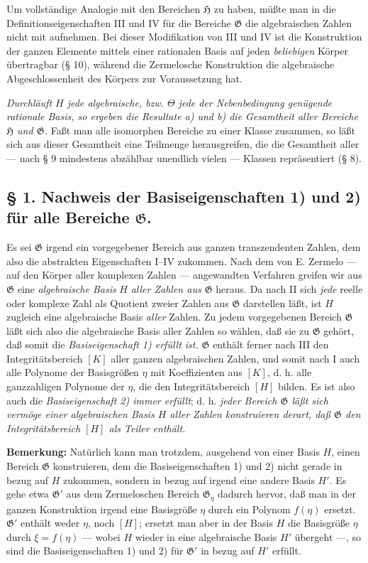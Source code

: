 \documentclass[11pt]{article}
\begin{document}
Um vollständige Analogie mit den Bereichen $\mathfrak H$ zu haben, müßte man
in die Definitionseigenschaften III und IV für die Bereiche $\mathfrak G$ die
algebraischen Zahlen nicht mit aufnehmen. Bei dieser Modifikation von III und
IV ist die Konstruktion der ganzen Elemente mittels einer rationalen Basis auf
jeden \emph{beliebigen} Körper übertragbar (§ 10), während die Zermelosche
Konstruktion die algebraische Abgeschlossenheit des Körpers zur Voraussetzung
hat.

\emph{Durchläuft $H$ jede algebraische, bzw. $\Theta$ jede der Nebenbedingung
genügende rationale Basis, so ergeben die Resultate a) und b) die Gesamtheit
aller Bereiche $\mathfrak H$ und $\mathfrak G$.} Faßt man alle isomorphen
Bereiche zu einer Klasse zusammen, so läßt sich aus dieser Gesamtheit eine
Teilmenge herausgreifen, die die Gesamtheit aller --- nach § 9 mindestens
abzählbar unendlich vielen --- Klassen repräsentiert (§ 8).

\subsection*{§ 1. Nachweis der Basiseigenschaften 1) und 2) für alle Bereiche
$\mathfrak G$.}

Es sei $\mathfrak G$ irgend ein vorgegebener Bereich aus ganzen transzendenten
Zahlen, dem also die abstrakten Eigenschaften I--IV zukommen. Nach dem von
E. Zermelo --- auf den Körper aller komplexen Zahlen --- angewandten Verfahren
greifen wir aus $\mathfrak G$ eine \emph{algebraische Basis} $H$ \emph{aller
Zahlen aus $\mathfrak G$} heraus. Da nach II sich \emph{jede} reelle oder
komplexe Zahl als Quotient zweier Zahlen aus $\mathfrak G$ darstellen läßt, ist
$H$ zugleich eine algebraische Basis \emph{aller} Zahlen. Zu jedem vorgegebenen
Bereich $\mathfrak G$ läßt sich also die algebraische Basis aller Zahlen so
wählen, daß sie zu $\mathfrak G$ gehört, daß somit die \emph{Basiseigenschaft 1)
erfüllt ist.} $\mathfrak G$ enthält ferner nach III den Integritätsbereich $[K]$
aller ganzen algebraischen Zahlen, und somit nach I auch alle Polynome der
Basisgrößen $\eta$ mit Koeffizienten aus $[K]$, d. h. alle ganzzahligen Polynome
der $\eta$, die den Integritätsbereich $[H]$ bilden. Es ist also auch die
\emph{Basiseigenschaft 2) immer erfüllt}; d. h. \emph{jeder Bereich
$\mathfrak G$ läßt sich vermöge einer algebraischen Basis $H$ aller Zahlen
konstruieren derart, daß $\mathfrak G$ den Integritätsbereich $[H]$ als Teiler
enthält.}

\textbf{Bemerkung:} Natürlich kann man trotzdem, ausgehend von einer Basis $H$,
einen Bereich $\mathfrak G$ konstruieren, dem die Basiseigenschaften 1) und 2)
nicht gerade in bezug auf $H$ zukommen, sondern in bezug auf irgend eine andere
Basis $H'$. Es gehe etwa $\mathfrak G'$ aus dem Zermeloschen Bereich
$\mathfrak G_\eta$ dadurch hervor, daß man in der ganzen Konstruktion irgend
eine Basisgröße $\eta$ durch ein Polynom $f(\eta)$ ersetzt. $\mathfrak G'$
enthält weder $\eta$, noch $[H]$; ersetzt man aber in der Basis $H$ die
Basisgröße $\eta$ durch $\xi=f(\eta)$ --- wobei $H$ wieder in eine algebraische
Basis $H'$ übergeht ---, so sind die Basiseigenschaften 1) und 2) für
$\mathfrak G'$ in bezug auf $H'$ erfüllt.
\end{document}
